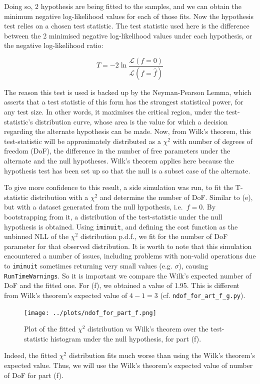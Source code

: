 \documentclass[12pt]{report} %
\begin{document}
Doing so, 2 hypothesis are being fitted to the samples, and we can obtain the minimum negative log-likelihood values for each of those fits\cite{iminuitmethod}. Now the hypothesis test relies on a chosen test statistic. The test statistic used here is the difference between the 2 minimised negative log-likelihood values under each hypothesis, or the negative log-likelihood ratio:

\begin{equation}
    T = -2 \ln{\frac{\mathcal{L}(f = 0)}{\mathcal{L}(f = \hat{f})}}
\end{equation}

The reason this test is used is backed up by the Neyman-Pearson Lemma, which asserts that a test statistic of this form has the strongest statistical power, for any test size. In other words, it maximises the critical region, under the test-statistic's distribution curve, whose area is the value for which a decision regarding the alternate hypothesis can be made\cite[p. 170]{Wass}. Now, from Wilk's theorem, this test-statistic will be approximately distributed as a $\chi^{2}$ with number of degrees of freedom (DoF), the difference in the number of free parameters under the alternate and the null hypotheses\cite{Wilkls1938}. Wilk's theorem applies here because the hypothesis test has been set up so that the null is a subset case of the alternate\cite{huelsenbeck1997phylogeny}.  

To give more confidence to this result, a side simulation was run, to fit the T-statistic distribution with a $\chi^{2}$ and determine the number of DoF. Similar to (e), but with a dataset generated from the null hypothesis, i.e.\ $f=0$. By bootstrapping from it, a distribution of the test-statistic under the null hypothesis is obtained. Using \texttt{iminuit}, and defining the cost function as the unbinned NLL of the $\chi^{2}$ distribution p.d.f., we fit for the number of DoF parameter for that observed distribution\cite{iminuitmethod}. It is worth to note that this simulation encountered a number of issues, including problems with non-valid operations due to \texttt{iminuit} sometimes returning very small values (e.g. $\sigma$), causing \texttt{RunTimeWarnings}. So it is important we compare the Wilk's expected number of DoF and the fitted one. For (f), we obtained a value of 1.95. This is different from Wilk's theorem's expected value of $4 - 1 = 3$ (cf. \texttt{ndof\_for\_art\_f\_g.py}).

\begin{figure}[htb]
    \centering
    \texttt{[image: ../plots/ndof\_for\_part\_f.png]}
    \captionsetup{margin=1.3cm}
    \caption[width=0.2\pdfpagewidth]{Plot of the fitted $\chi^{2}$ distribution vs Wilk's theorem over the test-statistic histogram under the null hypothesis, for part (f).}
\end{figure}
\newpage
Indeed, the fitted $\chi^{2}$ distribution fits much worse than using the Wilk's theorem's expected value. Thus, we will use the Wilk's theorem's expected value of number of DoF for part (f).  
\end{document}
